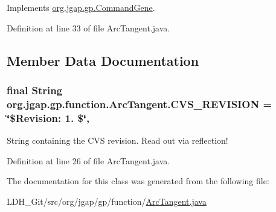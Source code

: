 Implements \hyperlink{classorg_1_1jgap_1_1gp_1_1_command_gene_a236141d99059da808afe7a9217e411c7}{org.\-jgap.\-gp.\-Command\-Gene}.



Definition at line 33 of file Arc\-Tangent.\-java.



\subsection{Member Data Documentation}
\hypertarget{classorg_1_1jgap_1_1gp_1_1function_1_1_arc_tangent_a6745bcec6afdb58c2b993658c97100b7}{
\subsubsection[{C\-V\-S\-\_\-\-R\-E\-V\-I\-S\-I\-O\-N}]{\setlength{\rightskip}{0pt plus 5cm}final String org.\-jgap.\-gp.\-function.\-Arc\-Tangent.\-C\-V\-S\-\_\-\-R\-E\-V\-I\-S\-I\-O\-N = \char`\"{}\$Revision\-: 1. \$\char`\"{}\hspace{0.3cm}{\ttfamily [static]}, {\ttfamily [private]}}}\label{classorg_1_1jgap_1_1gp_1_1function_1_1_arc_tangent_a6745bcec6afdb58c2b993658c97100b7}
String containing the C\-V\-S revision. Read out via reflection! 

Definition at line 26 of file Arc\-Tangent.\-java.



The documentation for this class was generated from the following file\-:\begin{DoxyCompactItemize}
\item 
L\-D\-H\-\_\-\-Git/src/org/jgap/gp/function/\hyperlink{_arc_tangent_8java}{Arc\-Tangent.\-java}\end{DoxyCompactItemize}
